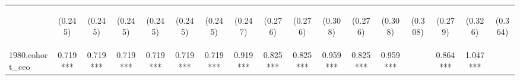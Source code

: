\begin{center}
\begin{tabular}{lcccccccccccccccc}
\vspace{4pt} & \begin{footnotesize}(0.245)\end{footnotesize} & \begin{footnotesize}(0.245)\end{footnotesize} & \begin{footnotesize}(0.245)\end{footnotesize} & \begin{footnotesize}(0.245)\end{footnotesize} & \begin{footnotesize}(0.245)\end{footnotesize} & \begin{footnotesize}(0.245)\end{footnotesize} & \begin{footnotesize}(0.247)\end{footnotesize} & \begin{footnotesize}(0.276)\end{footnotesize} & \begin{footnotesize}(0.276)\end{footnotesize} & \begin{footnotesize}(0.308)\end{footnotesize} & \begin{footnotesize}(0.276)\end{footnotesize} & \begin{footnotesize}(0.308)\end{footnotesize} & \begin{footnotesize}(0.308)\end{footnotesize} & \begin{footnotesize}(0.279)\end{footnotesize} & \begin{footnotesize}(0.326)\end{footnotesize} & \begin{footnotesize}(0.364)\end{footnotesize} \\
1980.cohort\_ceo & 0.719*** & 0.719*** & 0.719*** & 0.719*** & 0.719*** & 0.719*** & 0.919*** & 0.825*** & 0.825*** & 0.959*** & 0.825*** & 0.959*** &  & 0.864*** & 1.047*** &  \\

\end{tabular}
\end{center}
